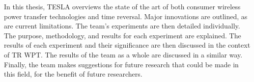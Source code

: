 In this thesis, TESLA overviews the state of the art of both consumer wireless power transfer technologies and time reversal. Major innovations are outlined, as are current limitations. The team's experiments are then detailed individually. The purpose, methodology, and results for each experiment are explained. The results of each experiment and their significance are then discussed in the context of TR WPT. The results of the team as a whole are discussed in a similar way. Finally, the team makes suggestions for future research that could be made in this field, for the benefit of future researchers.